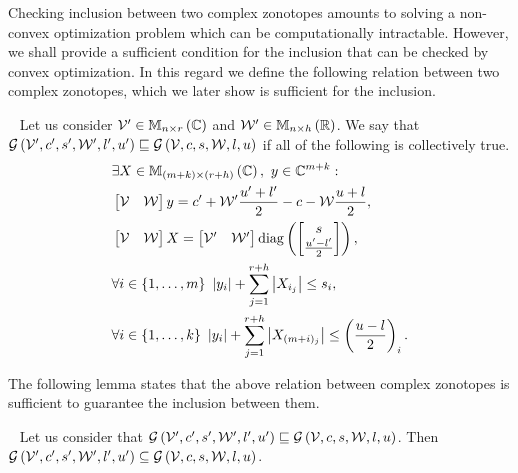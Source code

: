 Checking inclusion between two complex zonotopes amounts to
solving a non-convex optimization problem which can be computationally
intractable.  However, we shall provide a sufficient condition for
the inclusion that can be checked by convex optimization.  In
this regard we define the following relation between two complex
zonotopes, which we later show is sufficient for the inclusion.
%
\begin{definition}~\label{defn:inclusion}
Let us consider $\mathcal{V}^\prime\in\mathbb{M}_{n\times r}\left(\mathbb{C}\right)$ and
$\mathcal{W}^\prime\in\mathbb{M}_{n\times h}\left(\mathbb{R}\right)$.  We say that
$\mathcal{G}\left(\mathcal{V}^\prime,c^\prime,s^\prime,\mathcal{W}^\prime,l^\prime,u^\prime\right)
\sqsubseteq \mathcal{G}\left(\mathcal{V},c,s,\mathcal{W},l,u\right)$
if all of the following is collectively true.
%
\begin{align*}
  & \exists X\in\mathbb{M}_{(m+k)\times(r+h)}\left(\mathbb{C}\right),~y\in\mathbb{C}^{m+k}:\\
   & \left[\begin{matrix}\mathcal{V} & \mathcal{W}\end{matrix}\right]{y} = c^\prime+\mathcal{W}^\prime\frac{u^\prime+l^\prime}{2}-c-\mathcal{W}\frac{u+l}{2}, \\
  & \left[\begin{matrix}\mathcal{V} & \mathcal{W}\end{matrix}\right] X = \left[\begin{matrix}\mathcal{V}^\prime &
    \mathcal{W}^\prime\end{matrix}\right]\operatorname{diag}\left(\left[\begin{matrix}s
      \\ \frac{u^\prime-l^\prime}{2}\end{matrix}\right]\right),\\
  & \forall i\in\left\{1,\ldots,m\right\}~\left|y_i\right|+\sum_{j = 1}^{r+h}\left|X_{i_j}\right|
  \leq s_i,\\
  & \forall i\in\left\{1,\ldots,k\right\}~\left|y_i\right|+\sum_{j =
    1}^{r+h}\left|X_{(m+i)_j}\right|\leq \left(\frac{u-l}{2}\right)_i.
\end{align*}
%
\end{definition}
%
The following lemma states that the above relation between complex
zonotopes is sufficient to guarantee the inclusion between them.
%
\begin{lemma}~\label{lem:inclusion}
Let us consider that
$\mathcal{G}\left(\mathcal{V}^\prime,c^\prime,s^\prime,\mathcal{W}^\prime,l^\prime,u^\prime\right)
\sqsubseteq \mathcal{G}\left(\mathcal{V},c,s,\mathcal{W},l,u\right)$.  Then
$\mathcal{G}\left(\mathcal{V}^\prime,c^\prime,s^\prime,\mathcal{W}^\prime,l^\prime,u^\prime\right)
\subseteq \mathcal{G}\left(\mathcal{V},c,s,\mathcal{W},l,u\right)$.
\end{lemma}
%
